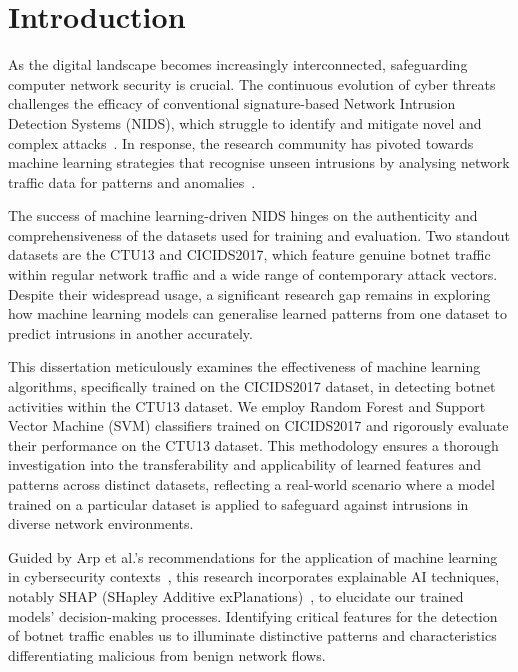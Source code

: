 \chapter{Introduction}\label{chap:introduction}

As the digital landscape becomes increasingly interconnected, safeguarding computer network security is crucial. The continuous evolution of cyber threats challenges the efficacy of conventional signature-based Network Intrusion Detection Systems (NIDS), which struggle to identify and mitigate novel and complex attacks~\cite{marchetti2016analysis}. In response, the research community has pivoted towards machine learning strategies that recognise unseen intrusions by analysing network traffic data for patterns and anomalies~\cite{buczak2015survey}.

The success of machine learning-driven NIDS hinges on the authenticity and comprehensiveness of the datasets used for training and evaluation. Two standout datasets are the CTU13 and CICIDS2017, which feature genuine botnet traffic within regular network traffic and a wide range of contemporary attack vectors. Despite their widespread usage, a significant research gap remains in exploring how machine learning models can generalise learned patterns from one dataset to predict intrusions in another accurately.

This dissertation meticulously examines the effectiveness of machine learning algorithms, specifically trained on the CICIDS2017 dataset, in detecting botnet activities within the CTU13 dataset. We employ Random Forest and Support Vector Machine (SVM) classifiers trained on CICIDS2017 and rigorously evaluate their performance on the CTU13 dataset. This methodology ensures a thorough investigation into the transferability and applicability of learned features and patterns across distinct datasets, reflecting a real-world scenario where a model trained on a particular dataset is applied to safeguard against intrusions in diverse network environments.

Guided by Arp et al.’s recommendations for the application of machine learning in cybersecurity contexts~\cite{arp2022and}, this research incorporates explainable AI techniques, notably SHAP (SHapley Additive exPlanations)~\cite{lundberg2017unified}, to elucidate our trained models’ decision-making processes. Identifying critical features for the detection of botnet traffic enables us to illuminate distinctive patterns and characteristics differentiating malicious from benign network flows.

